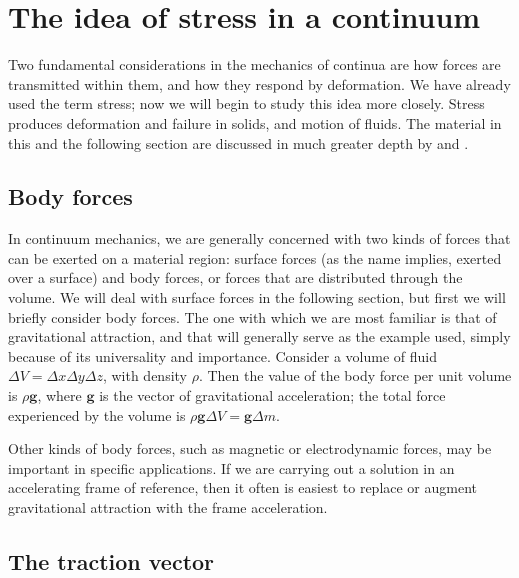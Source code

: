 \documentclass[twoside,11pt]		{report}
\begin{document}
\section{The idea of stress in a continuum}

Two fundamental considerations in the mechanics of continua are how
forces are transmitted within them, and how they respond by
deformation. We have already used the term stress; now we will begin
to study this idea more closely. Stress produces deformation and
failure in solids, and motion of fluids. The material in this and the
following section are discussed in much greater depth by
\citet{fung69} and \citet{aris62}.

\subsection{Body forces}

In continuum mechanics, we are generally concerned with two kinds of
forces that can be exerted on a material region: surface forces (as
the name implies, exerted over a surface) and body forces, or forces
that are distributed through the volume. We will deal with surface
forces in the following section, but first we will briefly consider
body forces. The one with which we are most familiar is that of
gravitational attraction, and that will generally serve as the example
used, simply because of its universality and importance.  Consider a
volume of fluid $\Delta V=\Delta x\Delta y\Delta z$, with density
$\rho$. Then the value of the body force per unit volume is $\rho\mathbf{g}$,
where $\mathbf{g}$ is the vector of gravitational acceleration; the total
force experienced by the volume is $\rho\mathbf{g}\Delta V=\mathbf{g}\Delta m$.

Other kinds of body forces, such as magnetic or electrodynamic forces,
may be important in specific applications. If we are carrying out a
solution in an accelerating frame of reference, then it often is
easiest to replace or augment gravitational attraction with the frame
acceleration.

\subsection{The traction vector}
\end{document}

